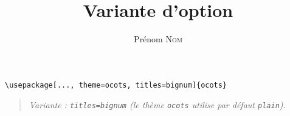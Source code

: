 \documentclass[11pt]{ocots-book}
\title{Variante d'option}
\author{Prénom \textsc{Nom}}
\newcommand{\ocotsvariantnote}[1]{\begin{quote}\itshape Variante : #1\end{quote}}
\begin{document}
\maketitle

\begin{lstlisting}
\usepackage[..., theme=ocots, titles=bignum]{ocots}
\end{lstlisting}
\ocotsvariantnote{\texttt{titles=bignum} (le th\`eme \texttt{ocots} utilise par d\'efaut \texttt{plain}).}

\end{document}

